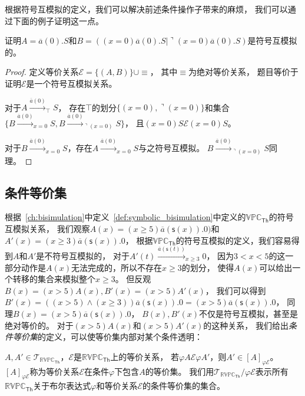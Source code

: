    根据符号互模拟的定义，我们可以解决前述条件操作子带来的麻烦，
   我们可以通过下面的例子证明这一点。
   \begin{example}
      证明$A=\overline{a}(0).S$和$B=((x=0) \overline{a}(0).S|\urcorner (x=0) \overline{a}(0).S)$是符号互模拟的。
   \end{example}
   \begin{proof}
      定义等价关系$\mathcal{E}=\{(A,B)\}\cup \equiv$，
      其中$\equiv$为绝对等价关系，
      题目等价于证明$\mathcal{E}$是一个符号互模拟关系。

      对于$A\stackrel{\overline{a}(0)}{\rightarrow}_{\top} S$，
      存在$\top$的划分$\{(x=0),\urcorner(x=0)\}$和集合
      $\{B\stackrel{\overline{a}(0)}{\longrightarrow}_{x=0}S, B\stackrel{\overline{a}(0)}{\longrightarrow}_{\urcorner(x=0)}S\}$，
      且$(x=0)S\mathcal{E}(x=0)S$。

      对于$B\stackrel{\overline{a}(0)}{\longrightarrow}_{x=0}S$，存在$A\stackrel{\overline{a}(0)}{\longrightarrow}_{x=0}S$与之符号互模拟。
      $B\stackrel{\overline{a}(0)}{\longrightarrow}_{\urcorner(x=0)}S$同理。
   \end{proof}

   \subsection{条件等价集}

   根据~\ref{ch:bisimulation}中定义~\ref{def:symbolic_bisimulation}中定义的$\mathbb{VPC}_{\mathsf{Th}}$的符号互模拟关系，
   我们观察$A(x)=(x\geq 5)\overline{a}(\mathsf{s}(x)).0)$和$A'(x)=(x\geq 3)\overline{a}(\mathsf{s}(x)).0$，
   根据$\mathbb{VPC}_\mathsf{Th}$的符号互模拟的定义，我们容易得到$A$和$A'$是不符号互模拟的，
   对于$A'(t)\stackrel{\overline{a}(\mathsf{s}(t))}{\longrightarrow}_{x\geq 3} 0$，
   因为$3<x<5$的这一部分动作是$A(x)$无法完成的，所以不存在$x\geq 3$的划分，
   使得$A(x)$可以给出一个转移的集合来模拟整个$x\geq 3$。
   但反观$B(x)=(x>5)A(x),B'(x)=(x>5)A'(x)$，
   我们可以得到$B'(x)=((x>5)\wedge(x\geq 3))\overline{a}(\mathsf{s}(x)).0=(x>5)\overline{a}(\mathsf{s}(x)).0$，
   同理$B(x)=(x>5)\overline{a}(\mathsf{s}(x)).0$，
   $B(x),B'(x)$不仅是符号互模拟，甚至是绝对等价的。
   对于$(x>5)A(x)$和$(x>5)A'(x)$的这种关系，
   我们给出\textit{条件等价集}的定义，可以使等价集内部对某个条件透明：

   \begin{definition}[条件等价集]
     $A,A'\in \mathcal{T}_{\mathbb{RVPC}_{\mathsf{Th}}}$，$\mathcal{E}$是$\mathbb{RVPC}_{\mathsf{Th}}$上的等价关系，
     若$\varphi A \mathcal{E} \varphi A'$，则$A'\in [A]_{\varphi \mathcal{E}}$。
     $[A]_{\varphi \mathcal{E}}$称为等价关系$\mathcal{E}$在条件$\varphi$下包含$A$的等价集。 
     我们用$\mathcal{T}_{\mathbb{RVPC}_{\mathsf{Th}}}/\varphi \mathcal{E}$表示所有$\mathbb{RVPC}_{\mathsf{Th}}$关于布尔表达式$\varphi$和等价关系$\mathcal{E}$的条件等价集的集合。 
   \end{definition} 

